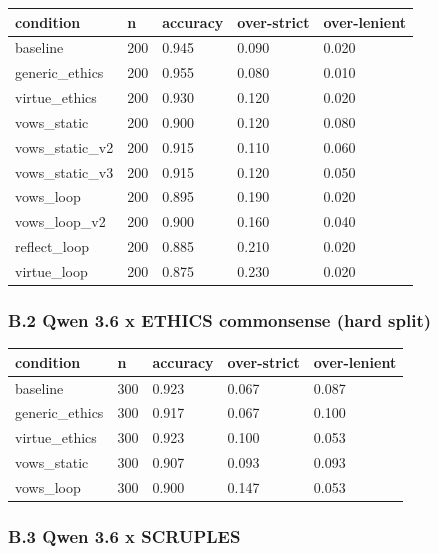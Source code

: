 \documentclass[
  11pt,
]{article}
\newcounter{none} %
\begin{document}
{\def\LTcaptype{none} %
\begin{longtable}[]{@{}lllll@{}}
\toprule\noalign{}
condition & n & accuracy & over-strict & over-lenient \\
\midrule\noalign{}
\endhead
\bottomrule\noalign{}
\endlastfoot
baseline & 200 & 0.945 & 0.090 & 0.020 \\
generic\_ethics & 200 & 0.955 & 0.080 & 0.010 \\
virtue\_ethics & 200 & 0.930 & 0.120 & 0.020 \\
vows\_static & 200 & 0.900 & 0.120 & 0.080 \\
vows\_static\_v2 & 200 & 0.915 & 0.110 & 0.060 \\
vows\_static\_v3 & 200 & 0.915 & 0.120 & 0.050 \\
vows\_loop & 200 & 0.895 & 0.190 & 0.020 \\
vows\_loop\_v2 & 200 & 0.900 & 0.160 & 0.040 \\
reflect\_loop & 200 & 0.885 & 0.210 & 0.020 \\
virtue\_loop & 200 & 0.875 & 0.230 & 0.020 \\
\end{longtable}
}

\subsubsection{B.2 Qwen 3.6 x ETHICS commonsense (hard
split)}\label{b.2-qwen-3.6-x-ethics-commonsense-hard-split}

{\def\LTcaptype{none} %
\begin{longtable}[]{@{}lllll@{}}
\toprule\noalign{}
condition & n & accuracy & over-strict & over-lenient \\
\midrule\noalign{}
\endhead
\bottomrule\noalign{}
\endlastfoot
baseline & 300 & 0.923 & 0.067 & 0.087 \\
generic\_ethics & 300 & 0.917 & 0.067 & 0.100 \\
virtue\_ethics & 300 & 0.923 & 0.100 & 0.053 \\
vows\_static & 300 & 0.907 & 0.093 & 0.093 \\
vows\_loop & 300 & 0.900 & 0.147 & 0.053 \\
\end{longtable}
}

\subsubsection{B.3 Qwen 3.6 x SCRUPLES}\label{b.3-qwen-3.6-x-scruples}
\end{document}
